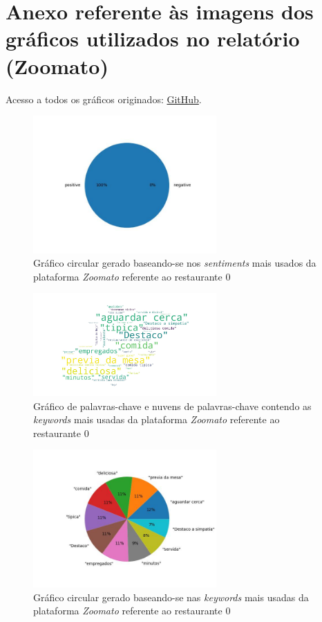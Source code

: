 \chapter{Anexo referente às imagens dos gráficos utilizados no relatório (Zoomato)}

Acesso a todos os gráficos originados: \href{https://github.com/CatKinKitKat/pi2021/tree/master/projecto/datascience/graphs/zomato/restaurantes}{GitHub}.

\label{an1}
\begin{figure}[!htb]
\centering
\includegraphics[width=7cm]{figuras/Zoomato/Restaurants/restaurante0_sentiments.jpeg}
\caption{Gráfico circular gerado baseando-se nos \textit{sentiments} mais usados da plataforma \textit{Zoomato} referente ao restaurante 0}
\label{fig:exemplofig}
\end{figure}

\begin{figure}[!htb]
\centering
\includegraphics[width=7cm]{figuras/Zoomato/Restaurants/restaurante0_keywordcloud.jpeg}
\caption{Gráfico de palavras-chave e nuvens de palavras-chave contendo as \textit{keywords} mais usadas da plataforma \textit{Zoomato} referente ao restaurante 0}
\label{fig:exemplofig}
\end{figure}

\begin{figure}[!htb]
\centering
\includegraphics[width=7cm]{figuras/Zoomato/Restaurants/restaurante0_keywords.jpeg}
\caption{Gráfico circular gerado baseando-se nas \textit{keywords} mais usadas da plataforma \textit{Zoomato} referente ao restaurante 0}
\label{fig:exemplofig}
\end{figure}

